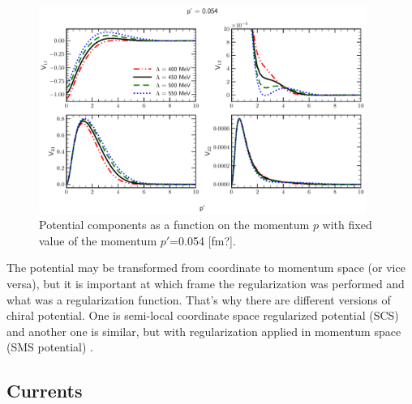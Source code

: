 \begin{figure}[htb]
    \begin{center}
    \includegraphics[width=0.95\textwidth]{PlotData/Deuteron/WAVEFUNC/potential_pp0.054.pdf}
    \end{center}
    \caption{Potential components as a function on the momentum $p$ with fixed
    value of the momentum $p'$=0.054 [fm?].
    }
    \label{potential_cutoff}
\end{figure}



The potential may be transformed from coordinate to momentum space (or vice versa),
but it is important at which frame the regularization was performed
and what was a regularization function. That's why there are different 
versions of chiral potential. One is semi-local coordinate space regularized potential (SCS) \cite{Epelbaum2014SCS}
and another one is similar, but with regularization applied in momentum space (SMS potential) \cite{reinkrebs2018}.


\subsection*{Currents}
 

